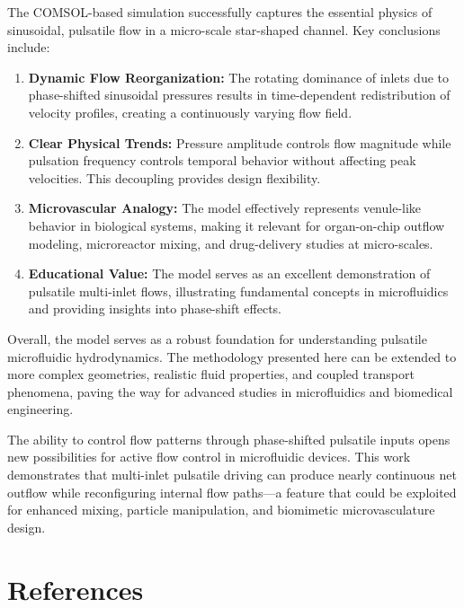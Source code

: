 \documentclass[12pt,a4paper]{article}
\begin{document}
The COMSOL-based simulation successfully captures the essential physics of sinusoidal, pulsatile flow in a micro-scale star-shaped channel. Key conclusions include:

\begin{enumerate}
  \item \textbf{Dynamic Flow Reorganization:} The rotating dominance of inlets due to phase-shifted sinusoidal pressures results in time-dependent redistribution of velocity profiles, creating a continuously varying flow field.
  
  \item \textbf{Clear Physical Trends:} Pressure amplitude controls flow magnitude while pulsation frequency controls temporal behavior without affecting peak velocities. This decoupling provides design flexibility.
  
  \item \textbf{Microvascular Analogy:} The model effectively represents venule-like behavior in biological systems, making it relevant for organ-on-chip outflow modeling, microreactor mixing, and drug-delivery studies at micro-scales.
  
  \item \textbf{Educational Value:} The model serves as an excellent demonstration of pulsatile multi-inlet flows, illustrating fundamental concepts in microfluidics and providing insights into phase-shift effects.
\end{enumerate}

Overall, the model serves as a robust foundation for understanding pulsatile microfluidic hydrodynamics. The methodology presented here can be extended to more complex geometries, realistic fluid properties, and coupled transport phenomena, paving the way for advanced studies in microfluidics and biomedical engineering.

The ability to control flow patterns through phase-shifted pulsatile inputs opens new possibilities for active flow control in microfluidic devices. This work demonstrates that multi-inlet pulsatile driving can produce nearly continuous net outflow while reconfiguring internal flow paths---a feature that could be exploited for enhanced mixing, particle manipulation, and biomimetic microvasculature design.

\newpage
\section*{References}
\end{document}
